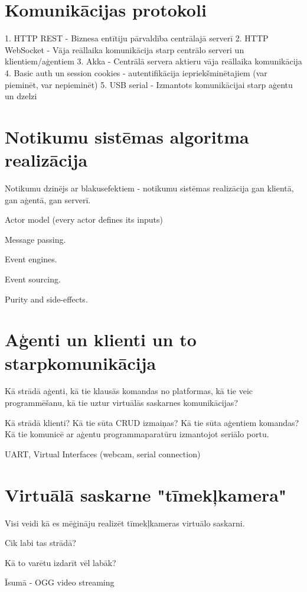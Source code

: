 \section{Komunikācijas protokoli}

1. HTTP REST - Biznesa entītiju pārvaldība centrālajā serverī
2. HTTP WebSocket - Vāja reāllaika komunikācija starp centrālo serveri un klientiem/aģentiem
3. Akka - Centrālā servera aktieru vāja reāllaika komunikācija
4. Basic auth un session cookies - autentifikācija iepriekšminētajiem (var pieminēt, var nepieminēt)
5. USB serial - Izmantots komunikācijai starp aģentu un dzelzi

\section{Notikumu sistēmas algoritma realizācija}

Notikumu dzinējs ar blakusefektiem - notikumu sistēmas realizācija gan klientā, gan aģentā, gan serverī.

Actor model (every actor defines its inputs)

Message passing.

Event engines.

Event sourcing.

Purity and side-effects.

\section{Aģenti un klienti un to starpkomunikācija}

Kā strādā aģenti, kā tie klausās komandas no platformas, kā tie veic programmēšanu,
kā tie uztur virtuālās saskarnes komunikācijas?

Kā strādā klienti? Kā tie sūta CRUD izmaiņas? Kā tie sūta aģentiem komandas? Kā tie
komunicē ar aģentu programmaparatūru izmantojot seriālo portu.

UART, Virtual Interfaces (webcam, serial connection)

\section{Virtuālā saskarne "tīmekļkamera"}

Visi veidi kā es mēģināju realizēt tīmekļkameras virtuālo saskarni.

Cik labi tas strādā?

Kā to varētu izdarīt vēl labāk?

Īsumā - OGG video streaming

